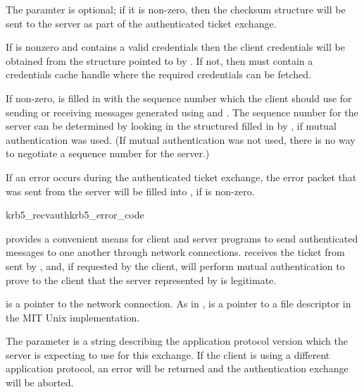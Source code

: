 The  paramter is optional; if it is non-zero, then the
checksum structure will be sent to the server as part of the
authenticated ticket exchange.

If  is nonzero and contains a valid credentials then
the client credentials will be obtained from the structure pointed to by
.  If not, then  must contain a
credentials cache handle where the required credentials can be fetched.

If non-zero,  is filled in with the sequence number
which the client should use for sending or receiving messages generated
using  and .  The sequence
number for the server can be determined by looking in the structured
filled in by , if mutual authentication was used.
(If mutual authentication was not used, there is no way to negotiate a
sequence number for the server.)

If an error occurs during the authenticated ticket exchange, the error
packet that was sent from the server will be filled into
, if  is non-zero.

\begin{funcdecl}{krb5_recvauth}{krb5_error_code}
\funcin
{}
\funcout
{}
\end{funcdecl}

 provides a convenient means for client and
server programs to send authenticated messages to one another through
network connections.   receives the ticket from
sent by , and, if requested by the client, will
perform mutual authentication to prove to the client that the server
represented by  is legitimate.

 is a pointer to the network connection.  As in
,  is a pointer to a file
descriptor in the MIT Unix implementation.

The parameter  is a string describing the
application protocol version which the server is expecting to use for
this exchange.  If the client is using a different application protocol,
an error will be returned and the authentication exchange will be
aborted.

